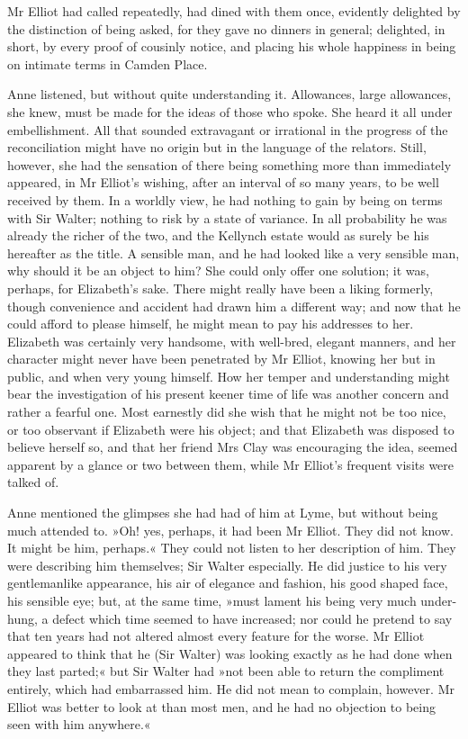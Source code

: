 Mr Elliot had called repeatedly, had dined with them once, evidently delighted by the distinction of being asked, for they gave no dinners in general; delighted, in short, by every proof of cousinly notice, and placing his whole happiness in being on intimate terms in Camden Place.

Anne listened, but without quite understanding it. Allowances, large allowances, she knew, must be made for the ideas of those who spoke. She heard it all under embellishment. All that sounded extravagant or irrational in the progress of the reconciliation might have no origin but in the language of the relators. Still, however, she had the sensation of there being something more than immediately appeared, in Mr Elliot's wishing, after an interval of so many years, to be well received by them. In a worldly view, he had nothing to gain by being on terms with Sir Walter; nothing to risk by a state of variance. In all probability he was already the richer of the two, and the Kellynch estate would as surely be his hereafter as the title. A sensible man, and he had looked like a very sensible man, why should it be an object to him? She could only offer one solution; it was, perhaps, for Elizabeth's sake. There might really have been a liking formerly, though convenience and accident had drawn him a different way; and now that he could afford to please himself, he might mean to pay his addresses to her. Elizabeth was certainly very handsome, with well-bred, elegant manners, and her character might never have been penetrated by Mr Elliot, knowing her but in public, and when very young himself. How her temper and understanding might bear the investigation of his present keener time of life was another concern and rather a fearful one. Most earnestly did she wish that he might not be too nice, or too observant if Elizabeth were his object; and that Elizabeth was disposed to believe herself so, and that her friend Mrs Clay was encouraging the idea, seemed apparent by a glance or two between them, while Mr Elliot's frequent visits were talked of.

Anne mentioned the glimpses she had had of him at Lyme, but without being much attended to. »Oh! yes, perhaps, it had been Mr Elliot. They did not know. It might be him, perhaps.« They could not listen to her description of him. They were describing him themselves; Sir Walter especially. He did justice to his very gentlemanlike appearance, his air of elegance and fashion, his good shaped face, his sensible eye; but, at the same time, »must lament his being very much under-hung, a defect which time seemed to have increased; nor could he pretend to say that ten years had not altered almost every feature for the worse. Mr Elliot appeared to think that he (Sir Walter) was looking exactly as he had done when they last parted;« but Sir Walter had »not been able to return the compliment entirely, which had embarrassed him. He did not mean to complain, however. Mr Elliot was better to look at than most men, and he had no objection to being seen with him anywhere.«

